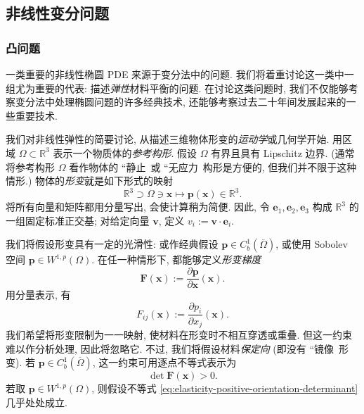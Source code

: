 \subsection{非线性变分问题}\label{sec:nonlinear-variational-problems}

\subsubsection{凸问题}\label{subsec:convex-variational-problems}

一类重要的非线性椭圆 PDE 来源于变分法中的问题. 我们将着重讨论这一类中一组尤为重要的代表: 描述\emph{弹性}材料平衡的问题. 在讨论这类问题时, 我们不仅能够考察变分法中处理椭圆问题的许多经典技术, 还能够考察过去二十年间发展起来的一些重要技术.

我们对非线性弹性的简要讨论, 从描述三维物体形变的\emph{运动学}或几何学开始. 用区域 $\Omega\subset\mathbb{R}^3$ 表示一个物质体的\emph{参考构形}. 假设 $\Omega$ 有界且具有 Lipschitz 边界. (通常将参考构形 $\Omega$ 看作物体的 ``静止\textquotesingle\textquotesingle\ 或 ``无应力\textquotesingle\textquotesingle\ 构形是方便的, 但我们并不限于这种情形.) 物体的\emph{形变}就是如下形式的映射
\begin{equation}\label{eq:elasticity-reference-deformation-mapping}
\mathbb{R}^3\supset\Omega\ni\bm{x}\mapsto\bm{p}(\bm{x})\in\mathbb{R}^3.
\end{equation}
将所有向量和矩阵都用分量写出, 会使计算稍为简便. 因此, 令 $\bm{e}_1,\bm{e}_2,\bm{e}_3$ 构成 $\mathbb{R}^3$ 的一组固定标准正交基; 对给定向量 $\bm{v}$, 定义 $v_i:=\bm{v}\cdot\bm{e}_i$.

我们将假设形变具有一定的光滑性: 或作经典假设 $\bm{p}\in C_b^1(\overline\Omega)$, 或使用 Sobolev 空间 $\bm{p}\in W^{1,p}(\Omega)$. 在任一种情形下, 都能够定义\emph{形变梯度}
\begin{equation}\label{eq:elasticity-deformation-gradient}
\bm{F}(\bm{x}):=\dfrac{\partial\bm{p}}{\partial\bm{x}}(\bm{x}).
\end{equation}
用分量表示, 有
\begin{equation}\label{eq:elasticity-deformation-gradient-components}
F_{ij}(\bm{x}):=\dfrac{\partial p_i}{\partial x_j}(\bm{x}).
\end{equation}
我们希望将形变限制为一一映射, 使材料在形变时不相互穿透或重叠. 但这一约束难以作分析处理, 因此将忽略它. 不过, 我们将假设材料\emph{保定向} (即没有 ``镜像\textquotesingle\textquotesingle\ 形变). 若 $\bm{p}\in C_b^1(\overline\Omega)$, 这一约束可用逐点不等式表示为
\begin{equation}\label{eq:elasticity-positive-orientation-determinant}
\det\bm{F}(\bm{x})>0.
\end{equation}
若取 $\bm{p}\in W^{1,p}(\Omega)$, 则假设不等式 \eqref{eq:elasticity-positive-orientation-determinant} 几乎处处成立.

